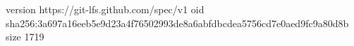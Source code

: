 version https://git-lfs.github.com/spec/v1
oid sha256:3a697a16eeb5e9d23a4f76502993de8a6abfdbcdea5756cd7e0aed9fc9a80d8b
size 1719
